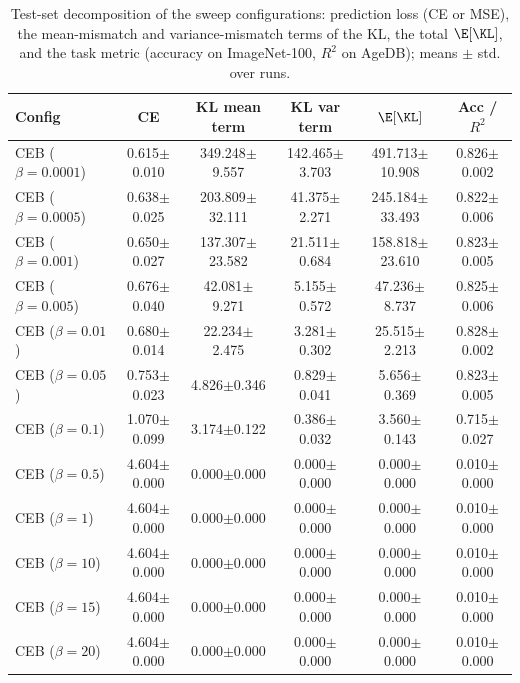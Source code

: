 \begin{table}[t]
\centering
\caption{Test-set decomposition of the sweep configurations: prediction loss (CE or MSE), the mean-mismatch and variance-mismatch terms of the KL, the total $\E[\KL]$, and the task metric (accuracy on ImageNet-100, $R^2$ on AgeDB); means $\pm$ std. over runs.}
\label{tab:compression_decomp}
\footnotesize
{
\setlength{\tabcolsep}{0.5pt}
\begin{tabular}{l c c c c c}
\hline
Config & CE & KL mean term & KL var term & $\E[\KL]$ & Acc / $R^2$ \\
\hline
CEB ($\beta=0.0001$) & 0.615$\pm$0.010 & 349.248$\pm$9.557 & 142.465$\pm$3.703 & 491.713$\pm$10.908 & 0.826$\pm$0.002 \\
CEB ($\beta=0.0005$) & 0.638$\pm$0.025 & 203.809$\pm$32.111 & 41.375$\pm$2.271 & 245.184$\pm$33.493 & 0.822$\pm$0.006 \\
CEB ($\beta=0.001$) & 0.650$\pm$0.027 & 137.307$\pm$23.582 & 21.511$\pm$0.684 & 158.818$\pm$23.610 & 0.823$\pm$0.005 \\
CEB ($\beta=0.005$) & 0.676$\pm$0.040 & 42.081$\pm$9.271 & 5.155$\pm$0.572 & 47.236$\pm$8.737 & 0.825$\pm$0.006 \\
CEB ($\beta=0.01$) & 0.680$\pm$0.014 & 22.234$\pm$2.475 & 3.281$\pm$0.302 & 25.515$\pm$2.213 & 0.828$\pm$0.002 \\
CEB ($\beta=0.05$) & 0.753$\pm$0.023 & 4.826$\pm$0.346 & 0.829$\pm$0.041 & 5.656$\pm$0.369 & 0.823$\pm$0.005 \\
CEB ($\beta=0.1$) & 1.070$\pm$0.099 & 3.174$\pm$0.122 & 0.386$\pm$0.032 & 3.560$\pm$0.143 & 0.715$\pm$0.027 \\
CEB ($\beta=0.5$) & 4.604$\pm$0.000 & 0.000$\pm$0.000 & 0.000$\pm$0.000 & 0.000$\pm$0.000 & 0.010$\pm$0.000 \\
CEB ($\beta=1$) & 4.604$\pm$0.000 & 0.000$\pm$0.000 & 0.000$\pm$0.000 & 0.000$\pm$0.000 & 0.010$\pm$0.000 \\
CEB ($\beta=10$) & 4.604$\pm$0.000 & 0.000$\pm$0.000 & 0.000$\pm$0.000 & 0.000$\pm$0.000 & 0.010$\pm$0.000 \\
CEB ($\beta=15$) & 4.604$\pm$0.000 & 0.000$\pm$0.000 & 0.000$\pm$0.000 & 0.000$\pm$0.000 & 0.010$\pm$0.000 \\
CEB ($\beta=20$) & 4.604$\pm$0.000 & 0.000$\pm$0.000 & 0.000$\pm$0.000 & 0.000$\pm$0.000 & 0.010$\pm$0.000 \\

\end{tabular}}
\end{table}
